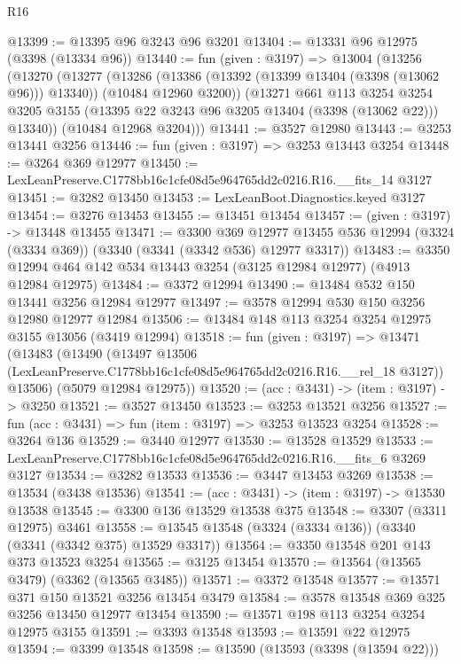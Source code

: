 \begin{lexlean}{R16}
\begin{coremodule}
@13399 := @13395 @96 @3243 @96 @3201
@13404 := @13331 @96 @12975 (@3398 (@13334 @96))
@13440 := fun (given : @3197) =>
  @13004
    (@13256
      (@13270
        (@13277
          (@13286
            (@13386 (@13392 (@13399 @13404 (@3398 (@13062 @96))) @13340))
            (@10484 @12960 @3200))
          (@13271
            @661
            @113
            @3254
            @3254
            @3205
            @3155
            (@13395 @22 @3243 @96 @3205 @13404 (@3398 (@13062 @22)))
            @13340))
        (@10484 @12968 @3204)))
@13441 := @3527 @12980
@13443 := @3253 @13441 @3256
@13446 := fun (given : @3197) => @3253 @13443 @3254
@13448 := @3264 @369 @12977
@13450 := LexLeanPreserve.C1778bb16c1cfe08d5e964765dd2c0216.R16.__fits_14 @3127
@13451 := @3282 @13450
@13453 := LexLeanBoot.Diagnostics.keyed @3127
@13454 := @3276 @13453
@13455 := @13451 @13454
@13457 := (given : @3197) -> @13448 @13455
@13471 := @3300
    @369
    @12977
    @13455
    @536
    @12994
    (@3324 (@3334 @369))
    (@3340 (@3341 (@3342 @536) @12977 @3317))
@13483 := @3350 @12994 @464 @142 @534 @13443 @3254 (@3125 @12984 @12977) (@4913 @12984 @12975)
@13484 := @3372 @12994
@13490 := @13484 @532 @150 @13441 @3256 @12984 @12977
@13497 := @3578 @12994 @530 @150 @3256 @12980 @12977 @12984
@13506 := @13484 @148 @113 @3254 @3254 @12975 @3155 @13056 (@3419 @12994)
@13518 := fun (given : @3197) =>
  @13471
    (@13483
      (@13490
        (@13497 @13506 (LexLeanPreserve.C1778bb16c1cfe08d5e964765dd2c0216.R16.__rel_18 @3127))
        @13506)
      (@5079 @12984 @12975))
@13520 := (acc : @3431) -> (item : @3197) -> @3250
@13521 := @3527 @13450
@13523 := @3253 @13521 @3256
@13527 := fun (acc : @3431) => fun (item : @3197) => @3253 @13523 @3254
@13528 := @3264 @136
@13529 := @3440 @12977
@13530 := @13528 @13529
@13533 := LexLeanPreserve.C1778bb16c1cfe08d5e964765dd2c0216.R16.__fits_6 @3269 @3127
@13534 := @3282 @13533
@13536 := @3447 @13453 @3269
@13538 := @13534 (@3438 @13536)
@13541 := (acc : @3431) -> (item : @3197) -> @13530 @13538
@13545 := @3300 @136 @13529 @13538 @375
@13548 := @3307 (@3311 @12975) @3461
@13558 := @13545 @13548 (@3324 (@3334 @136)) (@3340 (@3341 (@3342 @375) @13529 @3317))
@13564 := @3350 @13548 @201 @143 @373 @13523 @3254
@13565 := @3125 @13454
@13570 := @13564 (@13565 @3479) (@3362 (@13565 @3485))
@13571 := @3372 @13548
@13577 := @13571 @371 @150 @13521 @3256 @13454 @3479
@13584 := @3578 @13548 @369 @325 @3256 @13450 @12977 @13454
@13590 := @13571 @198 @113 @3254 @3254 @12975 @3155
@13591 := @3393 @13548
@13593 := @13591 @22 @12975
@13594 := @3399 @13548
@13598 := @13590 (@13593 (@3398 (@13594 @22)))

\end{coremodule}
\end{lexlean}
